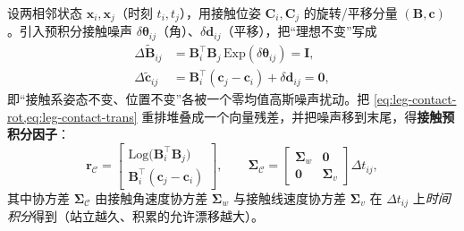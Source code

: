 \begin{derivation}[接触预积分残差]
设两相邻状态 $\mathbf{x}_i,\mathbf{x}_j$（时刻 $t_i,t_j$），用接触位姿 $\mathbf{C}_i,\mathbf{C}_j$ 的旋转/平移分量 $(\mathbf{B},\mathbf{c})$。引入预积分接触噪声 $\delta\boldsymbol{\theta}_{ij}$（角）、$\delta\mathbf{d}_{ij}$（平移），把“理想不变”写成
\begin{align}
  \Delta\tilde{\mathbf{B}}_{ij}&=\mathbf{B}_i^\top\mathbf{B}_j\,\mathrm{Exp}(\delta\boldsymbol{\theta}_{ij})=\mathbf{I},\label{eq:leg-contact-rot}\\
  \Delta\tilde{\mathbf{c}}_{ij}&=\mathbf{B}_i^\top(\mathbf{c}_j-\mathbf{c}_i)+\delta\mathbf{d}_{ij}=\mathbf{0},\label{eq:leg-contact-trans}
\end{align}
即“接触系姿态不变、位置不变”各被一个零均值高斯噪声扰动。把 \cref{eq:leg-contact-rot,eq:leg-contact-trans} 重排堆叠成一个向量残差，并把噪声移到末尾，得\textbf{接触预积分因子}：
\begin{equation}
  \mathbf{r}_{\mathcal{C}}=\begin{bmatrix}\mathrm{Log}\!\big(\mathbf{B}_i^\top\mathbf{B}_j\big)\\\mathbf{B}_i^\top(\mathbf{c}_j-\mathbf{c}_i)\end{bmatrix},\qquad
  \boldsymbol{\Sigma}_{\mathcal{C}}=\begin{bmatrix}\boldsymbol{\Sigma}_w & \mathbf{0}\\\mathbf{0} & \boldsymbol{\Sigma}_v\end{bmatrix}\Delta t_{ij},
  \label{eq:leg-contact-preint}
\end{equation}
其中协方差 $\boldsymbol{\Sigma}_{\mathcal{C}}$ 由接触角速度协方差 $\boldsymbol{\Sigma}_w$ 与接触线速度协方差 $\boldsymbol{\Sigma}_v$ 在 $\Delta t_{ij}$ 上\emph{时间积分}得到（站立越久、积累的允许漂移越大）。
\end{derivation}

